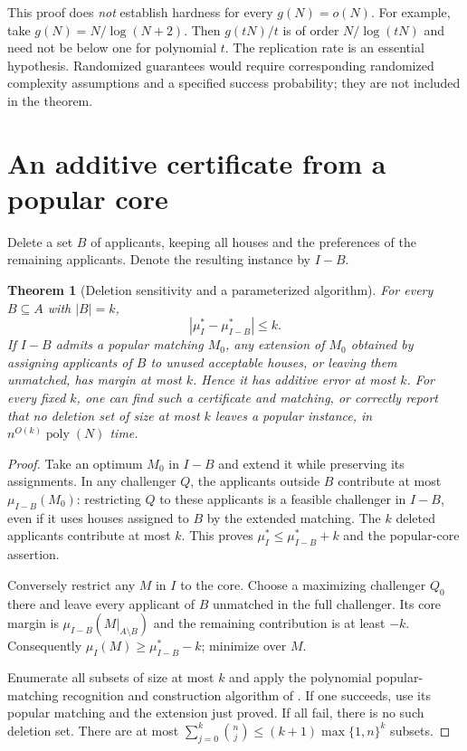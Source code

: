 \documentclass[11pt]{article}
\newtheorem{theorem}{Theorem}
\theoremstyle{remark}
\begin{document}
This proof does \emph{not} establish hardness for every $g(N)=o(N)$.
For example, take $g(N)=N/\log(N+2)$. Then $g(tN)/t$ is of order
$N/\log(tN)$ and need not be below one for polynomial $t$.
The replication rate is an essential hypothesis. Randomized guarantees
would require corresponding randomized complexity assumptions and a
specified success probability; they are not included in the theorem.

\section{An additive certificate from a popular core}
Delete a set $B$ of applicants, keeping all houses and the preferences
of the remaining applicants. Denote the resulting instance by $I-B$.

\begin{theorem}[Deletion sensitivity and a parameterized algorithm]
For every $B\subseteq A$ with $|B|=k$,
\[
 |\mu_I^*-\mu_{I-B}^*|\leq k.
\]
If $I-B$ admits a popular matching $M_0$, any extension of $M_0$ obtained
by assigning applicants of $B$ to unused acceptable houses, or leaving
them unmatched, has margin at most $k$. Hence it has additive error at
most $k$. For every fixed $k$, one can find such a certificate and
matching, or correctly report that no deletion set of size at most $k$
leaves a popular instance, in $n^{O(k)}\operatorname{poly}(N)$ time.
\end{theorem}
\begin{proof}
Take an optimum $M_0$ in $I-B$ and extend it while preserving its
assignments. In any challenger $Q$, the applicants outside $B$
contribute at most $\mu_{I-B}(M_0)$: restricting $Q$ to these applicants
is a feasible challenger in $I-B$, even if it uses houses assigned to
$B$ by the extended matching. The $k$ deleted applicants contribute at
most $k$. This proves $\mu_I^*\leq\mu_{I-B}^*+k$ and the popular-core
assertion.

Conversely restrict any $M$ in $I$ to the core. Choose a maximizing
challenger $Q_0$ there and leave every applicant of $B$ unmatched in the
full challenger. Its core margin is $\mu_{I-B}(M|_{A\setminus B})$ and
the remaining contribution is at least $-k$. Consequently
$\mu_I(M)\geq\mu_{I-B}^*-k$; minimize over $M$.

Enumerate all subsets of size at most $k$ and apply the polynomial
popular-matching recognition and construction algorithm of
\cite[Theorem 1]{survey}. If one succeeds, use its popular matching and
the extension just proved. If all fail, there is no such deletion set.
There are at most $\sum_{j=0}^k\binom nj\leq(k+1)\max\{1,n\}^k$ subsets.
\end{proof}
\end{document}

